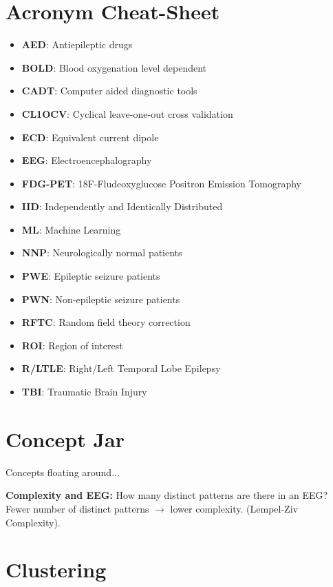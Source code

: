 \documentclass{article}
\begin{document}
    \section{Acronym Cheat-Sheet}
        \begin{itemize}
            \item \textbf{AED}: Antiepileptic drugs
            \item \textbf{BOLD}: Blood oxygenation level dependent
            \item \textbf{CADT}: Computer aided diagnostic tools
            \item \textbf{CL1OCV}: Cyclical leave-one-out cross validation
            \item \textbf{ECD}: Equivalent current dipole
            \item \textbf{EEG}: Electroencephalography
            \item \textbf{FDG-PET}: 18F-Fludeoxyglucose Positron Emission 
Tomography
            \item \textbf{IID}: Independently and Identically Distributed
            \item \textbf{ML}: Machine Learning
            \item \textbf{NNP}: Neurologically normal patients
            \item \textbf{PWE}: Epileptic seizure patients
            \item \textbf{PWN}: Non-epileptic seizure patients
            \item \textbf{RFTC}: Random field theory correction
            \item \textbf{ROI}: Region of interest
            \item \textbf{R/LTLE}: Right/Left Temporal Lobe Epilepsy
            \item \textbf{TBI}: Traumatic Brain Injury
        \end{itemize}

    \section{Concept Jar}
        Concepts floating around...

        \textbf{Complexity and EEG:} How many distinct patterns are there in an 
EEG?
        Fewer number of distinct patterns \ensuremath{\rightarrow} lower 
complexity.
        (Lempel-Ziv Complexity).

    \section{Clustering}
\end{document}
